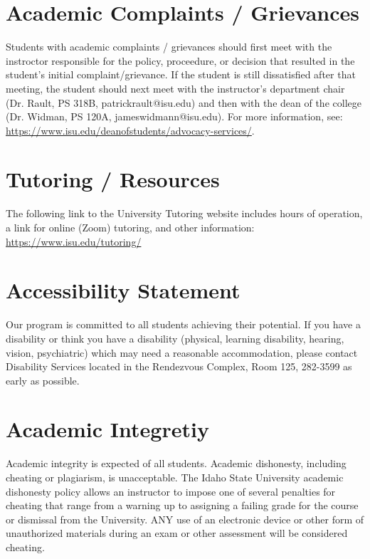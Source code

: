 \documentclass[11pt]{article}\usepackage[]{graphicx}\usepackage[]{xcolor}
\begin{document}
\section{Academic Complaints / Grievances}

Students with academic complaints / grievances should first meet with the instroctor responsible for the policy, proceedure, or decision that resulted in the student's initial complaint/grievance. If the student is still dissatisfied after that meeting, the student should next meet with the instructor's department chair (Dr. Rault, PS 318B, patrickrault@isu.edu) and then with the dean of the college (Dr. Widman, PS 120A, jameswidmann@isu.edu). For more information, see: \url{https://www.isu.edu/deanofstudents/advocacy-services/}.

\section{Tutoring / Resources}

The following link to the University Tutoring website includes hours of operation, a link for online (Zoom) tutoring, and other information: \url{https://www.isu.edu/tutoring/}

\section{Accessibility Statement}

Our program is committed to all students achieving their potential. 
If you have a disability or think you have a disability (physical, learning disability, hearing, vision, psychiatric) which may need a reasonable accommodation, please contact Disability Services located in the Rendezvous Complex, Room 125, 282-3599 as early as possible.

\section{Academic Integretiy}

Academic integrity is expected of all students. Academic dishonesty, including cheating or plagiarism, is unacceptable. 
The Idaho State University academic dishonesty policy allows an instructor to impose one of several penalties for cheating that range from a warning up to assigning a failing grade for the course or dismissal from the University. 
ANY use of an electronic device or other form of unauthorized materials during an exam or other assessment will be considered cheating. 
\end{document}
